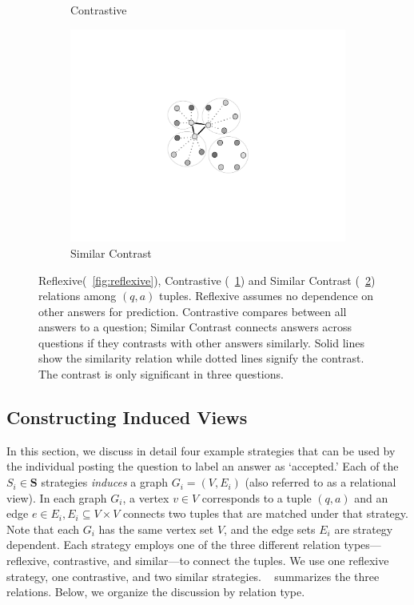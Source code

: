 \begin{figure}[h]
\begin{subfigure}{0.27\textwidth}
        \caption{Contrastive}
        \label{fig:contrastive}
    \end{subfigure}%
    \begin{subfigure}{0.25\textwidth}
        \centering
            \includegraphics[scale=0.4]{figures/similarContrast_old}
      \caption{Similar Contrast}
      \label{fig:similar}
        \end{subfigure}%
    \caption{\label{fig:relation} Reflexive(~\cref{fig:reflexive}), Contrastive (~\cref{fig:contrastive}) and Similar Contrast (~\cref{fig:similar}) relations among $(q,a)$ tuples. Reflexive assumes no dependence on other answers for prediction. Contrastive compares between all answers to a question;  Similar Contrast connects answers across questions if they contrasts with other answers similarly. Solid lines show the similarity relation while dotted lines signify the contrast. The contrast is only significant in three questions.}
\end{figure}

\subsection{Constructing Induced Views}
\label{sub:Induced Views}


In this section, we discuss in detail four example strategies that can be used by the individual posting the question to label an answer as `accepted.'
Each of the $S_i \in \mathbf{S}$ strategies \textit{induces} a graph $G_i = (V, E_i)$ (also referred to as a relational view).
In each graph $G_i$, a vertex $v \in V$ corresponds to a tuple $(q,a)$ and an edge $e \in E_i, E_i \subseteq V \times V$ connects two tuples that are matched under that strategy.
Note that each $G_i$ has the same vertex set $V$, and the edge sets $E_i$ are strategy dependent. Each strategy employs one of the three different relation types---reflexive, contrastive, and similar---to connect the tuples. We use one reflexive strategy, one contrastive, and two similar strategies.
~ summarizes the three relations. Below, we organize the discussion by relation type.

